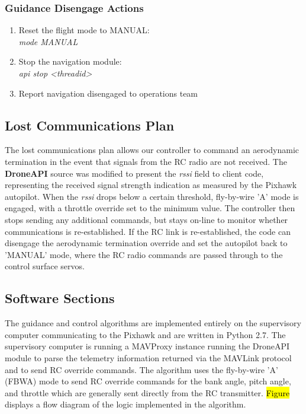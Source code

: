 \documentclass{aiaa}
\begin{document}
\subsubsection{Guidance Disengage Actions}
\begin{enumerate}
	\item Reset the flight mode to MANUAL: \\
	\textit{mode MANUAL}
	\item Stop the navigation module: \\
	\textit{api stop \textless threadid\textgreater}
	\item Report navigation disengaged to operations team
\end{enumerate}

\subsection{Lost Communications Plan}
The lost communications plan allows our controller to command an aerodynamic termination in the event that signals from the RC radio are not received. The \textbf{DroneAPI} source was modified to present the \textit{rssi} field to client code, representing the received signal strength indication as measured by the Pixhawk autopilot. When the \textit{rssi} drops below a certain threshold, fly-by-wire 'A' mode is engaged, with a throttle override set to the minimum value. The controller then stops sending any additional commands, but stays on-line to monitor whether communications is re-established. If the RC link is re-established, the code can disengage the aerodynamic termination override and set the autopilot back to 'MANUAL' mode, where the RC radio commands are passed through to the control surface servos.
\subsection{Software Sections}

The guidance and control algorithms are implemented entirely on the supervisory computer communicating to the Pixhawk and are written in Python 2.7. The supervisory computer is running a MAVProxy instance running the DroneAPI module to parse the telemetry information returned via the MAVLink protocol and to send RC override commands. The algorithm uses the fly-by-wire 'A' (FBWA) mode to send RC override commands for the bank angle, pitch angle, and throttle which are generally sent directly from the RC transmitter. \hl{Figure} displays a flow diagram of the logic implemented in the algorithm. 
\end{document}
